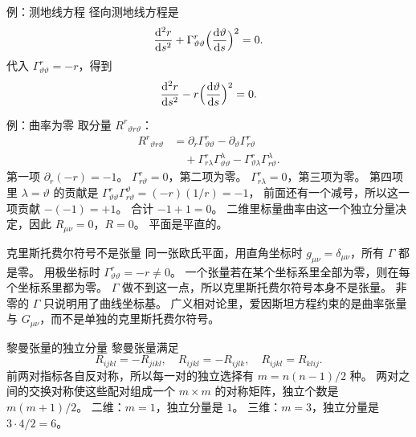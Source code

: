 \documentclass[fontset=windows, chinese, 10pt, xcolor=dvipsnames]{beamer}
\begin{document}
\begin{frame}{例：测地线方程}
  径向测地线方程是
  \begin{equation*}
    \frac{\mathrm{d}^2 r}{\mathrm{d}s^2}
    +\Gamma^r_{\vartheta\vartheta}
    \Bigl(\frac{\mathrm{d}\vartheta}{\mathrm{d}s}\Bigr)^2
    =0.
  \end{equation*}
  代入 $\Gamma^r_{\vartheta\vartheta}=-r$，得到
  \begin{equation*}
    \frac{\mathrm{d}^2 r}{\mathrm{d}s^2}
    -r\Bigl(\frac{\mathrm{d}\vartheta}{\mathrm{d}s}\Bigr)^2
    =0.
  \end{equation*}
\end{frame}

\begin{frame}{例：曲率为零}
  取分量 $R^r{}_{\vartheta r\vartheta}$：
  \begin{align*}
    R^r{}_{\vartheta r\vartheta}
    &= \partial_r\Gamma^r_{\vartheta\vartheta}
     - \partial_\vartheta\Gamma^r_{r\vartheta} \\
    &\quad
     + \Gamma^r_{r\lambda}\Gamma^\lambda_{\vartheta\vartheta}
     - \Gamma^r_{\vartheta\lambda}\Gamma^\lambda_{r\vartheta}.
  \end{align*}
  第一项 $\partial_r(-r)=-1$。
  $\Gamma^r_{r\vartheta}=0$，第二项为零。
  $\Gamma^r_{r\lambda}=0$，第三项为零。
  第四项里 $\lambda=\vartheta$ 的贡献是
  $\Gamma^r_{\vartheta\vartheta}\Gamma^\vartheta_{r\vartheta}
  =(-r)(1/r)=-1$，
  前面还有一个减号，所以这一项贡献 $-(-1)=+1$。
  合计 $-1+1=0$。
  二维里标量曲率由这一个独立分量决定，因此 $R_{\mu\nu}=0$，$R=0$。
  平面是平直的。
\end{frame}

\begin{frame}{克里斯托费尔符号不是张量}
  同一张欧氏平面，用直角坐标时 $g_{\mu\nu}=\delta_{\mu\nu}$，所有 $\Gamma$ 都是零。
  用极坐标时 $\Gamma^r_{\vartheta\vartheta}=-r\neq 0$。
  一个张量若在某个坐标系里全部为零，则在每个坐标系里都为零。
  $\Gamma$ 做不到这一点，所以克里斯托费尔符号本身不是张量。
  非零的 $\Gamma$ 只说明用了曲线坐标基。
  广义相对论里，爱因斯坦方程约束的是曲率张量与 $G_{\mu\nu}$，而不是单独的克里斯托费尔符号。
\end{frame}

\begin{frame}{黎曼张量的独立分量}
  黎曼张量满足
  \begin{equation*}
    R_{ijkl}=-R_{jikl},
    \quad
    R_{ijkl}=-R_{ijlk},
    \quad
    R_{ijkl}=R_{klij}.
  \end{equation*}
  前两对指标各自反对称，所以每一对的独立选择有
  $m=n(n-1)/2$ 种。
  两对之间的交换对称使这些配对组成一个 $m\times m$ 的对称矩阵，独立个数是 $m(m+1)/2$。
  \vspace{0.3em}
  二维：$m=1$，独立分量是 $1$。
  三维：$m=3$，独立分量是 $3\cdot 4/2=6$。
\end{frame}
\end{document}
